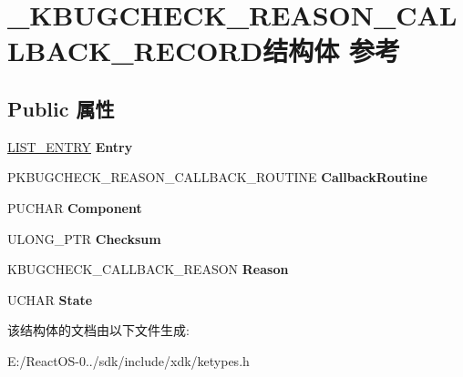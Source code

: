 \hypertarget{struct___k_b_u_g_c_h_e_c_k___r_e_a_s_o_n___c_a_l_l_b_a_c_k___r_e_c_o_r_d}{}\section{\+\_\+\+K\+B\+U\+G\+C\+H\+E\+C\+K\+\_\+\+R\+E\+A\+S\+O\+N\+\_\+\+C\+A\+L\+L\+B\+A\+C\+K\+\_\+\+R\+E\+C\+O\+R\+D结构体 参考}
\label{struct___k_b_u_g_c_h_e_c_k___r_e_a_s_o_n___c_a_l_l_b_a_c_k___r_e_c_o_r_d}
\subsection*{Public 属性}
\begin{DoxyCompactItemize}
\item 
\mbox{\label{struct___k_b_u_g_c_h_e_c_k___r_e_a_s_o_n___c_a_l_l_b_a_c_k___r_e_c_o_r_d_a69556c7180fe211c6f0d654cada794e9}} 
\hyperlink{struct___l_i_s_t___e_n_t_r_y}{L\+I\+S\+T\+\_\+\+E\+N\+T\+RY} {\bfseries Entry}
\item 
\mbox{\label{struct___k_b_u_g_c_h_e_c_k___r_e_a_s_o_n___c_a_l_l_b_a_c_k___r_e_c_o_r_d_afdb10c6565af104eb2025aecd5e29a9c}} 
P\+K\+B\+U\+G\+C\+H\+E\+C\+K\+\_\+\+R\+E\+A\+S\+O\+N\+\_\+\+C\+A\+L\+L\+B\+A\+C\+K\+\_\+\+R\+O\+U\+T\+I\+NE {\bfseries Callback\+Routine}
\item 
\mbox{\label{struct___k_b_u_g_c_h_e_c_k___r_e_a_s_o_n___c_a_l_l_b_a_c_k___r_e_c_o_r_d_aa038c4f98d64127a7189c536c9ad222d}} 
P\+U\+C\+H\+AR {\bfseries Component}
\item 
\mbox{\label{struct___k_b_u_g_c_h_e_c_k___r_e_a_s_o_n___c_a_l_l_b_a_c_k___r_e_c_o_r_d_a313831e9f54a9c3a447b17fb67d27653}} 
U\+L\+O\+N\+G\+\_\+\+P\+TR {\bfseries Checksum}
\item 
\mbox{\label{struct___k_b_u_g_c_h_e_c_k___r_e_a_s_o_n___c_a_l_l_b_a_c_k___r_e_c_o_r_d_a9d9579c6ec4a8f5d635e2e2fe0062e99}} 
K\+B\+U\+G\+C\+H\+E\+C\+K\+\_\+\+C\+A\+L\+L\+B\+A\+C\+K\+\_\+\+R\+E\+A\+S\+ON {\bfseries Reason}
\item 
\mbox{\label{struct___k_b_u_g_c_h_e_c_k___r_e_a_s_o_n___c_a_l_l_b_a_c_k___r_e_c_o_r_d_a1a66940cbf7988fe590497c541ad2368}} 
U\+C\+H\+AR {\bfseries State}
\end{DoxyCompactItemize}


该结构体的文档由以下文件生成\+:\begin{DoxyCompactItemize}
\item 
E\+:/\+React\+O\+S-\/0../sdk/include/xdk/ketypes.\+h\end{DoxyCompactItemize}
